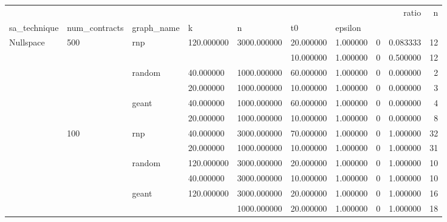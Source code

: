 \begin{tabular}{llllllllrr}
\toprule
 &  &  &  &  &  &  &  & ratio & n \\
sa_technique & num_contracts & graph_name & k & n & t0 & epsilon &  &  &  \\
\midrule
\multirow[t]{12}{*}{Nullspace} & \multirow[t]{6}{*}{500} & \multirow[t]{2}{*}{rnp} & \multirow[t]{2}{*}{120.000000} & \multirow[t]{2}{*}{3000.000000} & 20.000000 & 1.000000 & 0 & 0.083333 & 12 \\
\cline{6-10} \cline{7-10}
 &  &  &  &  & 10.000000 & 1.000000 & 0 & 0.500000 & 12 \\
\cline{3-10} \cline{4-10} \cline{5-10} \cline{6-10} \cline{7-10}
 &  & \multirow[t]{2}{*}{random} & 40.000000 & 1000.000000 & 60.000000 & 1.000000 & 0 & 0.000000 & 2 \\
\cline{4-10} \cline{5-10} \cline{6-10} \cline{7-10}
 &  &  & 20.000000 & 1000.000000 & 10.000000 & 1.000000 & 0 & 0.000000 & 3 \\
\cline{3-10} \cline{4-10} \cline{5-10} \cline{6-10} \cline{7-10}
 &  & \multirow[t]{2}{*}{geant} & 40.000000 & 1000.000000 & 60.000000 & 1.000000 & 0 & 0.000000 & 4 \\
\cline{4-10} \cline{5-10} \cline{6-10} \cline{7-10}
 &  &  & 20.000000 & 1000.000000 & 10.000000 & 1.000000 & 0 & 0.000000 & 8 \\
\cline{2-10} \cline{3-10} \cline{4-10} \cline{5-10} \cline{6-10} \cline{7-10}
 & \multirow[t]{6}{*}{100} & \multirow[t]{2}{*}{rnp} & 40.000000 & 3000.000000 & 70.000000 & 1.000000 & 0 & 1.000000 & 32 \\
\cline{4-10} \cline{5-10} \cline{6-10} \cline{7-10}
 &  &  & 20.000000 & 1000.000000 & 10.000000 & 1.000000 & 0 & 1.000000 & 31 \\
\cline{3-10} \cline{4-10} \cline{5-10} \cline{6-10} \cline{7-10}
 &  & \multirow[t]{2}{*}{random} & 120.000000 & 3000.000000 & 20.000000 & 1.000000 & 0 & 1.000000 & 10 \\
\cline{4-10} \cline{5-10} \cline{6-10} \cline{7-10}
 &  &  & 40.000000 & 3000.000000 & 10.000000 & 1.000000 & 0 & 1.000000 & 10 \\
\cline{3-10} \cline{4-10} \cline{5-10} \cline{6-10} \cline{7-10}
 &  & \multirow[t]{2}{*}{geant} & \multirow[t]{2}{*}{120.000000} & 3000.000000 & 20.000000 & 1.000000 & 0 & 1.000000 & 16 \\
\cline{5-10} \cline{6-10} \cline{7-10}
 &  &  &  & 1000.000000 & 20.000000 & 1.000000 & 0 & 1.000000 & 18 \\
\cline{1-10} \cline{2-10} \cline{3-10} \cline{4-10} \cline{5-10} \cline{6-10} \cline{7-10}

\end{tabular}
